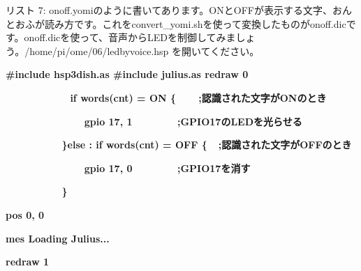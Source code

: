 \documentclass[a4paper,dvipdfmx]{jarticle}
\begin{document}
{
リスト 7:
onoff.yomiのように書いてあります。ONとOFFが表示する文字、おんとおふが読み方です。これをconvert\_yomi.shを使って変換したものがonoff.dicです。onoff.dicを使って、音声からLEDを制御してみましょう。/home/pi/ome/06/ledbyvoice.hsp
を開いてください。}



\centering
\begin{minipage}{17.006cm}
{\ttfamily\bfseries
\#include {\textquotedbl}hsp3dish.as{\textquotedbl}\newline
\#include {\textquotedbl}julius.as{\textquotedbl}\newline
\newline
redraw 0}

\begin{minipage}{16.621cm}
{\ttfamily\bfseries
\ \ \ \ \ \ \ \ 　　if words(cnt) = {\textquotedbl}ON{\textquotedbl} \{\ \ \ \ 
\textcolor[rgb]{0.0,0.0,0.6}{;認識された文字がONのとき}}

{\ttfamily\bfseries
\ \ \ \ \ \ \ \ \ \ \ \ \ \ gpio 17, 1\ \ \ \ \ \ \ \ 
\textcolor[rgb]{0.0,0.0,0.6}{;GPIO17のLEDを光らせる}}

{\ttfamily\bfseries
\ \ \ \ \ \ \ \ \ \ \}else : if words(cnt) = {\textquotedbl}OFF{\textquotedbl} \{\ \ 
\textcolor[rgb]{0.0,0.0,0.6}{;認識された文字がOFFのとき}}

{\ttfamily\bfseries
\ \ \ \ \ \ \ \ \ \ \ \ \ \ gpio 17, 0\ \ \ \ \ \ \ \  \textcolor[rgb]{0.0,0.0,0.6}{;GPIO17を消す}}

{\ttfamily\bfseries
\ \ \ \ \ \ \ \ \ \ \}}
\end{minipage}{\ttfamily\bfseries
pos 0, 0}

{\ttfamily\bfseries
mes {\textquotedbl}Loading Julius...{\textquotedbl}}

{\ttfamily\bfseries
redraw 1}


\bigskip


\end{minipage}
\end{document}

